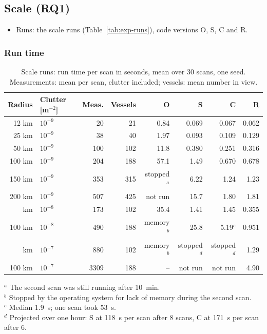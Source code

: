 \subsection{Scale (RQ1)}
\label{sec:res-scale}

\begin{itemize}
    \item Runs: the scale runs (Table~\ref{tab:exp-runs}), code versions O, S, C and R.
\end{itemize}

\subsubsection{Run time}

\begin{table}[htbp]
\centering
\caption{Scale runs: run time per scan in seconds, mean over 30 scans, one seed. Measurements: mean per scan, clutter included; vessels: mean number in view.}
\label{tab:res-ladder}
\small
\begin{tabular}{r l r r r r r r}
\toprule
Radius & Clutter [m$^{-2}$] & Meas. & Vessels & O & S & C & R \\
\midrule
12 km & $10^{-9}$ & 20 & 21 & 0.84 & 0.069 & 0.067 & 0.062 \\
25 km & $10^{-9}$ & 38 & 40 & 1.97 & 0.093 & 0.109 & 0.129 \\
50 km & $10^{-9}$ & 100 & 102 & 11.8 & 0.380 & 0.251 & 0.316 \\
100 km & $10^{-9}$ & 204 & 188 & 57.1 & 1.49 & 0.670 & 0.678 \\
150 km & $10^{-9}$ & 353 & 315 & stopped$^a$ & 6.22 & 1.24 & 1.23 \\
200 km & $10^{-9}$ & 507 & 425 & not run & 15.7 & 1.80 & 1.81 \\
\addlinespace
50 km & $10^{-8}$ & 173 & 102 & 35.4 & 1.41 & 1.45 & 0.355 \\
100 km & $10^{-8}$ & 490 & 188 & memory$^b$ & 25.8 & 5.19$^c$ & 0.951 \\
\addlinespace
50 km & $10^{-7}$ & 880 & 102 & memory$^b$ & stopped$^d$ & stopped$^d$ & 1.29 \\
100 km & $10^{-7}$ & 3309 & 188 & -- & not run & not run & 4.90 \\
\bottomrule
\end{tabular}

\smallskip
\footnotesize
$^a$ The second scan was still running after 10~min. \\ $^b$ Stopped by the operating system for lack of memory during the second scan. \\ $^c$ Median 1.9~s; one scan took 53~s. \\ $^d$ Projected over one hour: S at 118~s per scan after 8 scans, C at 171~s per scan after 6.
\end{table}

